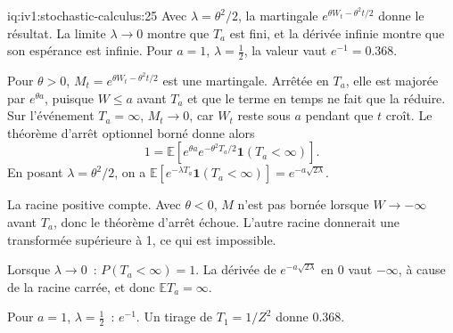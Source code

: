 \begin{solution}{iq:iv1:stochastic-calculus:25}
Avec $\lambda = \theta^2/2$, la martingale $e^{\theta W_t - \theta^2t/2}$ donne le résultat. La limite $\lambda \to 0$ montre que $T_a$ est fini, et la dérivée infinie montre que son espérance est infinie. Pour $a = 1$, $\lambda = \frac12$, la valeur vaut $e^{-1} = 0.368$.

Pour $\theta > 0$, $M_t = e^{\theta W_t - \theta^2t/2}$ est une martingale. Arrêtée en $T_a$, elle est majorée par $e^{\theta a}$, puisque $W \le a$ avant $T_a$ et que le terme en temps ne fait que la réduire. Sur l'événement $T_a = \infty$, $M_t \to 0$, car $W_t$ reste sous $a$ pendant que $t$ croît. Le théorème d'arrêt optionnel borné donne alors
\[
1 = \mathbb{E}\left[e^{\theta a}e^{-\theta^2T_a/2}\mathbf{1}(T_a < \infty)\right].
\]
En posant $\lambda = \theta^2/2$, on a $\mathbb{E}[e^{-\lambda T_a}\mathbf{1}(T_a < \infty)] = e^{-a\sqrt{2\lambda}}$.

La racine positive compte. Avec $\theta < 0$, $M$ n'est pas bornée lorsque $W \to -\infty$ avant $T_a$, donc le théorème d'arrêt échoue. L'autre racine donnerait une transformée supérieure à 1, ce qui est impossible.

Lorsque $\lambda \to 0$~: $P(T_a < \infty) = 1$. La dérivée de $e^{-a\sqrt{2\lambda}}$ en 0 vaut $-\infty$, à cause de la racine carrée, et donc $\mathbb{E}T_a = \infty$.

Pour $a = 1$, $\lambda = \frac12$~: $e^{-1}$. Un tirage de $T_1 = 1/Z^2$ donne $0.368$.



\end{solution}

